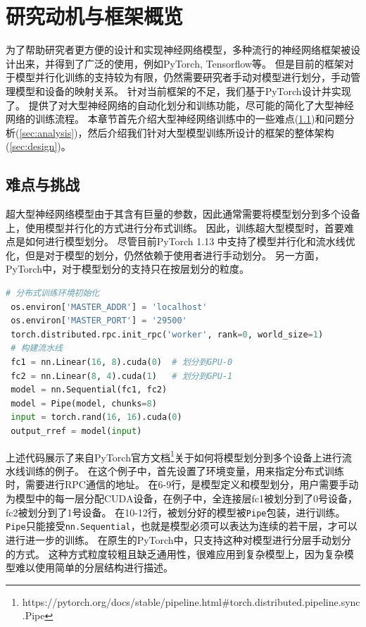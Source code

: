 \chapter{研究动机与框架概览}
\label{chapter:analysis}

为了帮助研究者更方便的设计和实现神经网络模型，多种流行的神经网络框架被设计出来，并得到了广泛的使用，例如PyTorch, Tensorflow等。
但是目前的框架对于模型并行化训练的支持较为有限，仍然需要研究者手动对模型进行划分，手动管理模型和设备的映射关系。
针对当前框架的不足，我们基于PyTorch设计并实现了\sys{}。
\sys{}提供了对大型神经网络的自动化划分和训练功能，尽可能的简化了大型神经网络的训练流程。
本章节首先介绍大型神经网络训练中的一些难点(\ref{sec:difficulties})和问题分析(\ref{sec:analysis})，然后介绍我们针对大型模型训练所设计的\sys{}框架的整体架构(\ref{sec:design})。

\section{难点与挑战}
\label{sec:difficulties}

超大型神经网络模型由于其含有巨量的参数，因此通常需要将模型划分到多个设备上，使用模型并行化的方式进行分布式训练。
因此，训练超大型模型时，首要难点是如何进行模型划分。
尽管目前PyTorch 1.13 中支持了模型并行化和流水线优化，但是对于模型的划分，仍然依赖于使用者进行手动划分。
另一方面，PyTorch中，对于模型划分的支持只在按层划分的粒度。
\begin{lstlisting}[language=Python, caption={PyTorch 1.13中的流水线并行化}]
 # 分布式训练环境初始化
 os.environ['MASTER_ADDR'] = 'localhost'
 os.environ['MASTER_PORT'] = '29500'
 torch.distributed.rpc.init_rpc('worker', rank=0, world_size=1)
 # 构建流水线
 fc1 = nn.Linear(16, 8).cuda(0)  # 划分到GPU-0
 fc2 = nn.Linear(8, 4).cuda(1)   # 划分到GPU-1
 model = nn.Sequential(fc1, fc2)
 model = Pipe(model, chunks=8)
 input = torch.rand(16, 16).cuda(0)
 output_rref = model(input)
\end{lstlisting}


上述代码展示了来自PyTorch官方文档\footnote[1]{https://pytorch.org/docs/stable/pipeline.html\#torch.distributed.pipeline.sync.Pipe}关于如何将模型划分到多个设备上进行流水线训练的例子。
在这个例子中，首先设置了环境变量，用来指定分布式训练时，需要进行RPC通信的地址。
在6-9行，是模型定义和模型划分，用户需要手动为模型中的每一层分配CUDA设备，在例子中，全连接层fc1被划分到了0号设备，fc2被划分到了1号设备。
在10-12行，被划分好的模型被\texttt{Pipe}包装，进行训练。
\texttt{Pipe}只能接受\texttt{nn.Sequential}，也就是模型必须可以表达为连续的若干层，才可以进行进一步的训练。
在原生的PyTorch中，只支持这种对模型进行分层手动划分的方式。
这种方式粒度较粗且缺乏通用性，很难应用到复杂模型上，因为复杂模型难以使用简单的分层结构进行描述。

